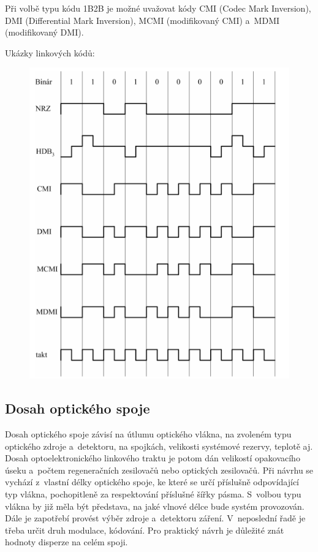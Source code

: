 Při volbě typu kódu 1B2B je možné uvažovat kódy CMI (Codec Mark Inversion), DMI (Differential Mark Inversion), MCMI (modifikovaný CMI) a~MDMI (modifikovaný DMI).

Ukázky linkových kódů:
\begin{figure}[!ht]
  \begin{center}
    \includegraphics[scale=1]{obrazky/linkody.png}
  \end{center}
\end{figure}

\subsection{Dosah optického spoje}
Dosah optického spoje závisí na útlumu optického vlákna, na zvoleném typu optického zdroje a~detektoru, na spojkách, velikosti systémové rezervy, teplotě aj. Dosah optoelektronického linkového traktu je potom dán velikostí opakovacího úseku a~počtem regeneračních zesilovačů nebo optických zesilovačů. Při návrhu se vychází z~vlastní délky optického spoje, ke které se určí příslušně odpovídající typ vlákna, pochopitleně za respektování příslušné šířky pásma. S~volbou typu vlákna by již měla být představa, na jaké vlnové délce bude systém provozován. Dále je zapotřebí provést výběr zdroje a~detektoru záření. V~neposlední řadě je třeba určit druh modulace, kódování. Pro praktický návrh je důležité znát hodnoty disperze na celém spoji.

